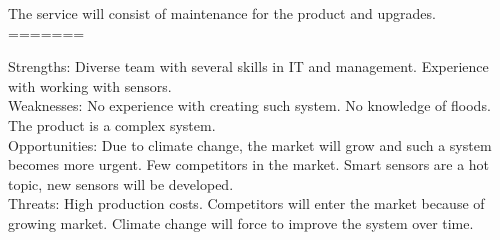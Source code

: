 The service will consist of maintenance for the product and upgrades.
=======

Strengths: Diverse team with several skills in IT and management. Experience with working with sensors.\\ 
Weaknesses: No experience with creating such system. No knowledge of floods. The product is a complex system.\\
Opportunities: Due to climate change, the market will grow and such a system becomes more urgent. Few competitors in the market. Smart sensors are a hot topic, new sensors will be developed.\\
Threats: High production costs. Competitors will enter the market because of growing market. Climate change will force to improve the system over time.\\

\newcommand{\SwotItems}[1]{
	\begin{itemize}
		#1
	\end{itemize}
}

\newcommand{\Strengths}{
\SwotItems{
	\item Adjustable system that is future proof
	\item Having a low selling price. Lower then the competitors
	\item Diverse team with several skills in IT and management
	\item Having a good management team
	\item Frequent discussion with technical and business experts in the field.
	\item Experience with working with sensors
}
}

\newcommand{\Weaknesses}{
\SwotItems{
	\item Decisions need to be made by the entire project team. There is a higher chance of a difference of opinion is members, holding back the project and leads to time wastes
	\item No experience with creating such system
	\item No knowledge of floods
	\item The product is a complex system
	\item Some main features rely on country-specific systems
}
}

